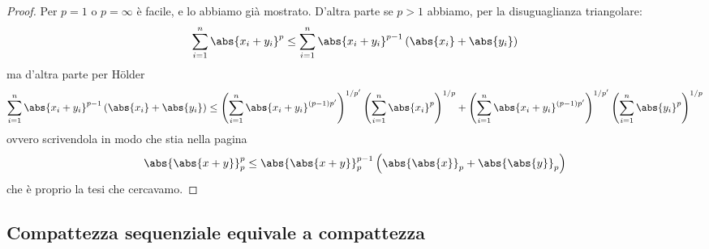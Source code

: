 \documentclass[11pt]{scrartcl}
\begin{document}
	\begin{proof}
		Per $p=1$ o $p=\infty$ è facile, e lo abbiamo già mostrato. D'altra parte se $p>1$ abbiamo, per la disuguaglianza triangolare:
		$$\sum_{i=1}^{n}\abs{x_i+y_i}^p\le \sum_{i=1}^{n}\abs{x_i+y_i}^{p-1}\left(\abs{x_i}+\abs{y_i}\right)$$
		ma d'altra parte per H\"older
		$$\sum_{i=1}^{n}\abs{x_i+y_i}^{p-1}\left(\abs{x_i}+\abs{y_i}\right)\le \left(\sum_{i=1}^{n}\abs{x_i+y_i}^{(p-1)p'}\right)^{1/p'}\left(\sum_{i=1}^{n}\abs{x_i}^p\right)^{1/p}+\left(\sum_{i=1}^{n}\abs{x_i+y_i}^{(p-1)p'}\right)^{1/p'}\left(\sum_{i=1}^{n}\abs{y_i}^p\right)^{1/p}$$
		ovvero scrivendola in modo che stia nella pagina
		$$\abs{\abs{x+y}}_p^p\le \abs{\abs{x+y}}_p^{p-1}\left(\abs{\abs{x}}_p+\abs{\abs{y}}_p\right)$$
		che è proprio la tesi che cercavamo.
	\end{proof}
	
	\subsection{Compattezza sequenziale equivale a compattezza}
	
\end{document}
